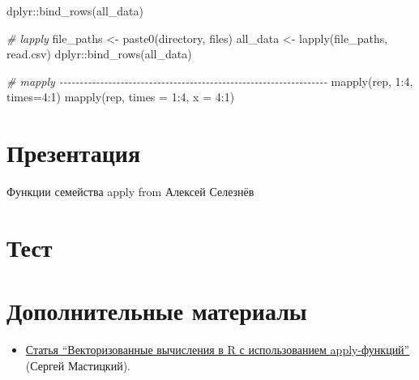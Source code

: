\documentclass[
]{book}
\newenvironment{Shaded}{\begin{snugshade}}{\end{snugshade}}
\newcommand{\AttributeTok}[1]{\textcolor[rgb]{0.77,0.63,0.00}{#1}}
\newcommand{\CommentTok}[1]{\textcolor[rgb]{0.56,0.35,0.01}{\textit{#1}}}
\newcommand{\DecValTok}[1]{\textcolor[rgb]{0.00,0.00,0.81}{#1}}
\newcommand{\FunctionTok}[1]{\textcolor[rgb]{0.00,0.00,0.00}{#1}}
\newcommand{\NormalTok}[1]{#1}
\newcommand{\OtherTok}[1]{\textcolor[rgb]{0.56,0.35,0.01}{#1}}
\newcommand{\SpecialCharTok}[1]{\textcolor[rgb]{0.00,0.00,0.00}{#1}}
\providecommand{\tightlist}{%
  \setlength{\itemsep}{0pt}\setlength{\parskip}{0pt}}
\begin{document}
\begin{Shaded}
\begin{Highlighting}[]
\NormalTok{dplyr}\SpecialCharTok{::}\FunctionTok{bind\_rows}\NormalTok{(all\_data)}

\CommentTok{\# lapply}
\NormalTok{file\_paths }\OtherTok{\textless{}{-}} \FunctionTok{paste0}\NormalTok{(directory, files)}
\NormalTok{all\_data }\OtherTok{\textless{}{-}} \FunctionTok{lapply}\NormalTok{(file\_paths, read.csv)}
\NormalTok{dplyr}\SpecialCharTok{::}\FunctionTok{bind\_rows}\NormalTok{(all\_data)}


\CommentTok{\# mapply {-}{-}{-}{-}{-}{-}{-}{-}{-}{-}{-}{-}{-}{-}{-}{-}{-}{-}{-}{-}{-}{-}{-}{-}{-}{-}{-}{-}{-}{-}{-}{-}{-}{-}{-}{-}{-}{-}{-}{-}{-}{-}{-}{-}{-}{-}{-}{-}{-}{-}{-}{-}{-}{-}{-}{-}{-}{-}{-}{-}{-}{-}{-}{-}{-}{-}}
\FunctionTok{mapply}\NormalTok{(rep, }\DecValTok{1}\SpecialCharTok{:}\DecValTok{4}\NormalTok{, }\AttributeTok{times=}\DecValTok{4}\SpecialCharTok{:}\DecValTok{1}\NormalTok{)}
\FunctionTok{mapply}\NormalTok{(rep, }\AttributeTok{times =} \DecValTok{1}\SpecialCharTok{:}\DecValTok{4}\NormalTok{, }\AttributeTok{x =} \DecValTok{4}\SpecialCharTok{:}\DecValTok{1}\NormalTok{)}
\end{Highlighting}
\end{Shaded}

\hypertarget{ux43fux440ux435ux437ux435ux43dux442ux430ux446ux438ux44f-1}{%
\section{Презентация}\label{ux43fux440ux435ux437ux435ux43dux442ux430ux446ux438ux44f-1}}

Функции семейства apply from Алексей Селезнёв

\hypertarget{ux442ux435ux441ux442-2}{%
\section{Тест}\label{ux442ux435ux441ux442-2}}

\hypertarget{ux434ux43eux43fux43eux43bux43dux438ux442ux435ux43bux44cux43dux44bux435-ux43cux430ux442ux435ux440ux438ux430ux43bux44b}{%
\section{Дополнительные материалы}\label{ux434ux43eux43fux43eux43bux43dux438ux442ux435ux43bux44cux43dux44bux435-ux43cux430ux442ux435ux440ux438ux430ux43bux44b}}

\begin{itemize}
\tightlist
\item
  \href{https://r-analytics.blogspot.com/2012/11/r-apply.html}{Статья ``Векторизованные вычисления в R с использованием apply-функций''} (Сергей Мастицкий).
\end{itemize}
\end{document}
